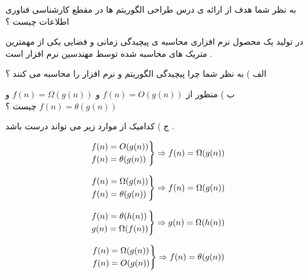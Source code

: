\documentclass[12pt]{article}
\begin{document}
\noindent
به نظر شما هدف از ارائه ی درس طراحی الگوریتم ها در مقطع کارشناسی فناوری اطلاعات چیست ؟


\vspace{30pt}

\noindent
در تولید یک محصول نرم افزاری محاسبه ی پیچیدگی زمانی و فضایی یکی از مهمترین متریک های محاسبه شده توسط مهندسین نرم افزار است .


\vspace{30pt}


\noindent
الف ) به نظر شما چرا پیچیدگی الگوریتم و نرم افزار را محاسبه می کنند ؟

\vspace{30pt}


\noindent
ب ) منظور از 
$f(n) = O(g(n))$
و
$f(n) = \Omega(g(n))$
و
$f(n) = \theta(g(n))$
چیست ؟


\vspace{30pt}



\noindent
ج ) کدامیک از موارد زیر می تواند درست باشد .

\begin{align*}
\begin{rcases}
f(n) = O(g(n)) \\
f(n) = \theta(g(n))
\end{rcases} \Rightarrow
f(n) = \Omega(g(n))
\end{align*}


\begin{align*}
\begin{rcases}
f(n) = \Omega(g(n)) \\
f(n) = \theta(g(n))
\end{rcases} \Rightarrow
f(n) = \Omega(g(n))
\end{align*}




\begin{align*}
\begin{rcases}
f(n) = \theta(h(n)) \\
g(n) = \Omega(f(n))
\end{rcases} \Rightarrow
g(n) = \Omega(h(n))
\end{align*}




\begin{align*}
\begin{rcases}
f(n) = \Omega(g(n)) \\
f(n) = O(g(n))
\end{rcases} \Rightarrow
f(n) = \theta(g(n))
\end{align*}
\end{document}
